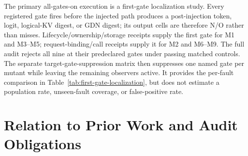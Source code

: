 \documentclass{article}
\begin{document}
The primary all-gates-on execution is a first-gate localization study.  Every registered gate
fires before the injected path produces a post-injection token, logit,
logical-KV digest, or GDN digest; its output cells are therefore N/O rather
than misses.
Lifecycle/ownership/storage receipts supply the first gate for M1 and M3--M5;
request-binding/call receipts supply it for M2 and M6--M9.  The full audit
rejects all nine at their predeclared gates under passing matched controls.
The separate target-gate-suppression matrix then suppresses one named gate per mutant while leaving
the remaining observers active.  It provides the per-fault comparison in
Table~\ref{tab:first-gate-localization}, but does not estimate a population
rate, unseen-fault coverage, or false-positive rate.

\section{Relation to Prior Work and Audit Obligations}
\label{app:novelty-boundary}
\end{document}
